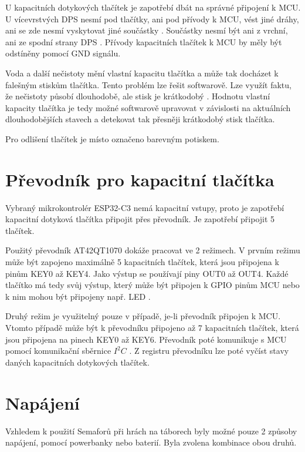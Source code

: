 U kapacitních dotykových tlačítek je zapotřebí dbát na správné připojení k MCU. U vícevrstvých DPS nesmí pod tlačítky, ani pod přívody
k MCU, vést jiné dráhy, ani se zde nesmí vyskytovat jiné součástky \cite{PrincipKapTl}. Součástky nesmí být ani z vrchní, ani ze spodní 
strany DPS \cite{PrincipKapTl}. Přívody kapacitních tlačítek k MCU by měly být odstíněny pomocí GND signálu.

Voda a další nečistoty mění vlastní kapacitu tlačítka a může tak docházet k falešným stiskům tlačítka. Tento problém lze řešit softwarově. 
Lze využít faktu, že nečistoty působí dlouhodobě, ale stisk je krátkodobý \cite{PrincipKapTl}. Hodnotu vlastní kapacity tlačítka je tedy
možné softwarově upravovat v závislosti na aktuálních dlouhodobějších stavech a detekovat tak přesněji krátkodobý stisk tlačítka.

Pro odlišení tlačítek je místo označeno barevným potiskem. 

\section{Převodník pro kapacitní tlačítka}
Vybraný mikrokontrolér ESP32-C3 nemá kapacitní vstupy, proto je zapotřebí kapacitní dotyková tlačítka připojit přes převodník. Je zapotřebí připojit 
5 tlačítek. 

Použitý převodník AT42QT1070 dokáže pracovat ve 2 režimech. V prvním režimu může být zapojeno maximálně 5 kapacitních tlačítek, která jsou připojena
k pinům KEY0 až KEY4. Jako výstup se používají piny OUT0 až OUT4. Každé tlačítko má tedy svůj výstup, který může být připojen k GPIO pinům MCU 
nebo k nim mohou být připojeny např. LED \cite{conv_cap_but_AT42QT1070_dtsh}. 

Druhý režim je využitelný pouze v případě, je-li převodník připojen k MCU. Vtomto případě může být k převodníku připojeno až 7 kapacitních tlačítek, 
která jsou připojena na pinech KEY0 až KEY6. Převodník poté komunikuje s MCU pomocí komunikační sběrnice $I^2C$ \cite{conv_cap_but_AT42QT1070_dtsh}. 
Z registru převodníku lze poté vyčíst stavy daných kapacitních dotykových tlačítek. 

\section{Napájení}
Vzhledem k použití Semaforů při hrách na táborech byly možné pouze 2 způsoby napájení, pomocí powerbanky nebo baterií. Byla zvolena kombinace obou druhů.

